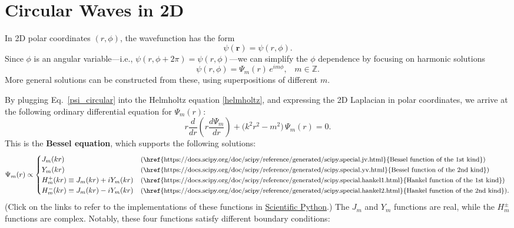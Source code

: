 \documentclass[pra,12pt]{revtex4}
\begin{document}
\section{Circular Waves in 2D}
\label{circular_waves}

In 2D polar coordinates $(r, \phi)$, the wavefunction has the form
\begin{equation}
  \psi(\mathbf{r}) = \psi(r,\phi).
\end{equation}
Since $\phi$ is an angular variable---i.e., $\psi(r,\phi + 2\pi) =
\psi(r, \phi)$---we can simplify the $\phi$ dependence by focusing on
harmonic solutions
\begin{equation}
  \psi(r,\phi) = \Psi_m(r)\, e^{im\phi}, \;\;\;m \in\mathbb{Z}.
  \label{psi_circular}
\end{equation}
More general solutions can be constructed from these, using
superpositions of different $m$.

By plugging Eq.~\eqref{psi_circular} into the Helmholtz equation
\eqref{helmholtz}, and expressing the 2D Laplacian in polar
coordinates, we arrive at the following ordinary differential equation
for $\Psi_m(r)$:
\begin{equation}
  r \frac{d}{dr}\!\left(r \frac{d\Psi_m}{dr} \right)
  + \Big(k^2 r^2 - m^2 \Big)\, \Psi_m(r) = 0.
  \label{besseleq}
\end{equation}
This is the \textbf{Bessel equation}, which supports the following
solutions:
\begin{equation}
  \Psi_m(r) \propto \begin{cases}
    J_m(kr) &\text{\small(\href{https://docs.scipy.org/doc/scipy/reference/generated/scipy.special.jv.html}{Bessel function of the 1st kind})} \\
    Y_m(kr) &\text{\small(\href{https://docs.scipy.org/doc/scipy/reference/generated/scipy.special.yv.html}{Bessel function of the 2nd kind})} \\
    H_m^+(kr) \equiv J_m(kr) + i Y_m(kr) &\text{\small(\href{https://docs.scipy.org/doc/scipy/reference/generated/scipy.special.hankel1.html}{Hankel function of the 1st kind})} \\
    H_m^-(kr) \equiv J_m(kr) - i Y_m(kr) &\text{\small(\href{https://docs.scipy.org/doc/scipy/reference/generated/scipy.special.hankel2.html}{Hankel function of the 2nd kind})}.
  \end{cases}
\end{equation}
(Click on the links to refer to the implementations of these functions
in \href{https://scipy.org/}{Scientific Python}.)  The $J_m$ and $Y_m$
functions are real, while the $H_m^\pm$ functions are complex.
Notably, these four functions satisfy different boundary conditions:
\end{document}
